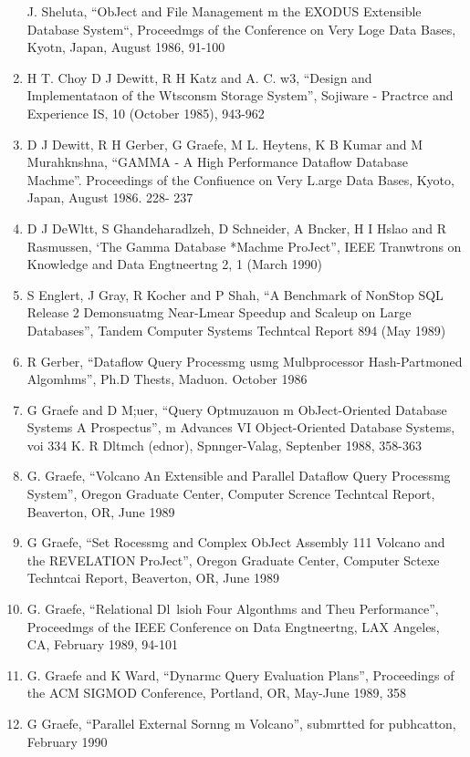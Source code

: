 \documentclass[a4paper,11pt,notitlepage,twoside,openright]{article}
\begin{document}
\begin{enumerate}
  J. Sheluta, “ObJect and File Management m the
  EXODUS Extensible Database System“, Proceedmgs
  of the Conference on Very Loge Data Bases, Kyotn,
  Japan, August 1986, 91-100
  \item
  H T. Choy D J Dewitt, R H Katz and A. C.
  w3, “Design and Implementataon of the Wtsconsm
  Storage System”, Sojiware - Practrce and Experience
  IS, 10 (October 1985), 943-962
  \item
  D J Dewitt, R H Gerber, G Graefe, M L.
  Heytens, K B Kumar and M Murahknshna,
  “GAMMA - A High Performance Dataflow Database
  Machme”. Proceedings of the Confiuence on Very
  L.arge Data Bases, Kyoto, Japan, August 1986. 228-
  237
  \item
  D J DeWltt, S Ghandeharadlzeh, D Schneider, A
  Bncker, H I Hslao and R Rasmussen, ‘The
  Gamma Database *Machme ProJect”, IEEE
  Tranwtrons on Knowledge and Data Engtneertng 2,
  1 (March 1990)
  \item
  S Englert, J Gray, R Kocher and P Shah, “A
  Benchmark of NonStop SQL Release 2 Demonsuatmg
  Near-Lmear Speedup and Scaleup on Large
  Databases”, Tandem Computer Systems Techntcal
  Report 894 (May 1989)
  \item
  R Gerber, “Dataflow Query Processmg usmg
  Mulbprocessor Hash-Partmoned Algomhms”, Ph.D
  Thests, Maduon. October 1986
  \item
  G Graefe and D M;uer, “Query Optmuzauon m
  ObJect-Oriented Database Systems A Prospectus”, m
  Advances VI Object-Oriented Database Systems, voi
  334 K. R Dltmch (ednor), Spnnger-Valag,
  Septenber 1988, 358-363
  \item
  G. Graefe, “Volcano An Extensible and Parallel
  Dataflow Query Processmg System”, Oregon
  Graduate Center, Computer Scrence Techntcal Report,
  Beaverton, OR, June 1989
  \item
  G Graefe, “Set Rocessmg and Complex ObJect
  Assembly 111 Volcano and the REVELATION
  ProJect”, Oregon Graduate Center, Computer Sctexe
  Techntcai Report, Beaverton, OR, June 1989
  \item
  G. Graefe, “Relational Dl~lsioh Four Algonthms
  and Theu Performance”, Proceedmgs of the IEEE
  Conference on Data Engtneertng, LAX Angeles, CA,
  February 1989, 94-101
  \item
  G. Graefe and K Ward, “Dynarmc Query Evaluation
  Plans”, Proceedings of the ACM SIGMOD
  Conference, Portland, OR, May-June 1989, 358
  \item
  G Graefe, “Parallel External Sornng m Volcano”,
  submrtted for pubhcatton, February 1990

\end{enumerate}
\end{document}
